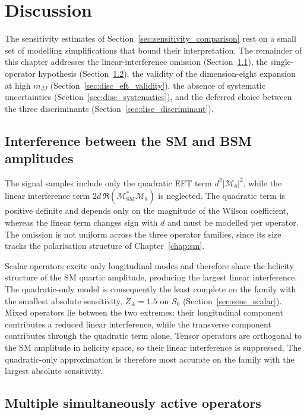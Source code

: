 \chapter{Discussion}
\label{chap:discussion}

The sensitivity estimates of Section~\ref{sec:sensitivity_comparison} rest on a small set of modelling simplifications that bound their interpretation. The remainder of this chapter addresses the linear-interference omission (Section~\ref{sec:disc_interference}), the single-operator hypothesis (Section~\ref{sec:disc_multi_operator}), the validity of the dimension-eight expansion at high $m_{JJ}$ (Section~\ref{sec:disc_eft_validity}), the absence of systematic uncertainties (Section~\ref{sec:disc_systematics}), and the deferred choice between the three discriminants (Section~\ref{sec:disc_discriminant}).

\section{Interference between the SM and BSM amplitudes}
\label{sec:disc_interference}

The signal samples include only the quadratic EFT term $d^{2}|\mathcal{M}_{8}|^{2}$, while the linear interference term $2d\,\Re(\mathcal{M}_{\mathrm{SM}}^{*}\mathcal{M}_{8})$ is neglected. The quadratic term is positive definite and depends only on the magnitude of the Wilson coefficient, whereas the linear term changes sign with $d$ and must be modelled per operator. The omission is not uniform across the three operator families, since its size tracks the polarisation structure of Chapter~\ref{chap:sm}.

Scalar operators excite only longitudinal modes and therefore share the helicity structure of the SM quartic amplitude, producing the largest linear interference. The quadratic-only model is consequently the least complete on the family with the smallest absolute sensitivity, $Z_A=1.5$ on $S_0$ (Section~\ref{sec:sens_scalar}). Mixed operators lie between the two extremes: their longitudinal component contributes a reduced linear interference, while the transverse component contributes through the quadratic term alone. Tensor operators are orthogonal to the SM amplitude in helicity space, so their linear interference is suppressed. The quadratic-only approximation is therefore most accurate on the family with the largest absolute sensitivity.

\section{Multiple simultaneously active operators}
\label{sec:disc_multi_operator}

